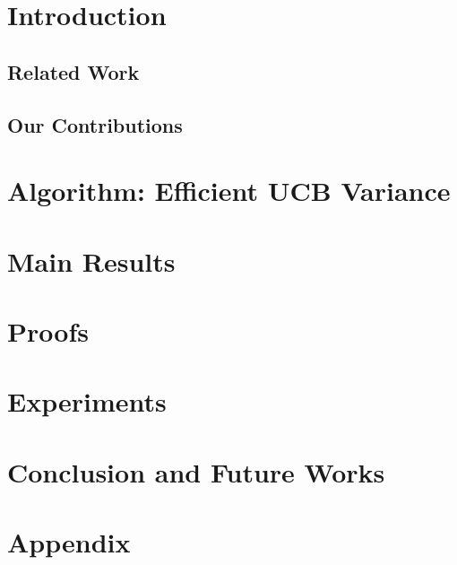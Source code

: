 \documentclass[letterpaper]{article} %
\begin{document}
\section{Introduction}
\label{sec:intro}


\subsection{Related Work}
\label{sec:related}



\subsection{Our Contributions}
\label{sec:contri}


\section{Algorithm: Efficient UCB Variance}
\label{sec:eucbv}


\section{Main Results} 
\label{sec:results}


\section{Proofs}
\label{sec:proofTheorem}


\section{Experiments}
\label{sec:expt}


\vspace*{-2mm}
\section{Conclusion and Future Works}
\label{sec:conc}



\clearpage
\newpage






\clearpage
\newpage


\section{Appendix}
\label{sec:app}

\end{document}
